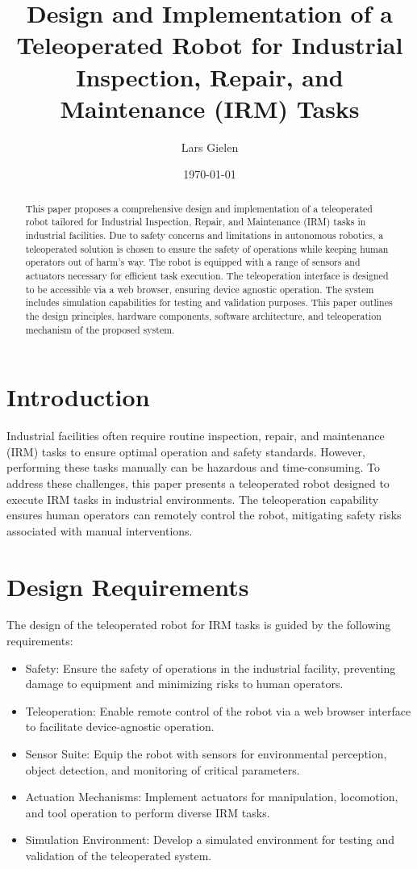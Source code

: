 \documentclass{article}
\title{Design and Implementation of a Teleoperated Robot for Industrial Inspection, Repair, and Maintenance (IRM) Tasks}
\author{Lars Gielen }
\date{\today}
\begin{document}
\maketitle

\begin{abstract}
This paper proposes a comprehensive design and implementation of a teleoperated robot tailored for Industrial Inspection, Repair, and Maintenance (IRM) tasks in industrial facilities. Due to safety concerns and limitations in autonomous robotics, a teleoperated solution is chosen to ensure the safety of operations while keeping human operators out of harm's way. The robot is equipped with a range of sensors and actuators necessary for efficient task execution. The teleoperation interface is designed to be accessible via a web browser, ensuring device agnostic operation. The system includes simulation capabilities for testing and validation purposes. This paper outlines the design principles, hardware components, software architecture, and teleoperation mechanism of the proposed system.
\end{abstract}

\section{Introduction}

Industrial facilities often require routine inspection, repair, and maintenance (IRM) tasks to ensure optimal operation and safety standards. However, performing these tasks manually can be hazardous and time-consuming. To address these challenges, this paper presents a teleoperated robot designed to execute IRM tasks in industrial environments. The teleoperation capability ensures human operators can remotely control the robot, mitigating safety risks associated with manual interventions.

\section{Design Requirements}

The design of the teleoperated robot for IRM tasks is guided by the following requirements:

\begin{itemize}
    \item Safety: Ensure the safety of operations in the industrial facility, preventing damage to equipment and minimizing risks to human operators.
    \item Teleoperation: Enable remote control of the robot via a web browser interface to facilitate device-agnostic operation.
    \item Sensor Suite: Equip the robot with sensors for environmental perception, object detection, and monitoring of critical parameters.
    \item Actuation Mechanisms: Implement actuators for manipulation, locomotion, and tool operation to perform diverse IRM tasks.
    \item Simulation Environment: Develop a simulated environment for testing and validation of the teleoperated system.
\end{itemize}
\end{document}
